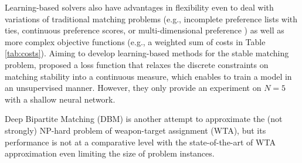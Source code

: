 Learning-based solvers also have advantages in flexibility even to deal with variations of traditional matching problems (e.g., incomplete preference lists with ties, continuous preference scores, or multi-dimensional preference \cite{multi_stable_matching}) as well as more complex objective functions (e.g., a weighted sum of costs in Table \ref{tab:costs}).
Aiming to develop learning-based methods for the stable matching problem, \cite{harvard2019} proposed a loss function that relaxes the discrete constraints on matching stability into a continuous measure, which enables to train a model in an unsupervised manner.
However, they only provide an experiment on $N=5$ with a shallow neural network.

Deep Bipartite Matching (DBM) \cite{gibbons2019deep} is another attempt to approximate the (not strongly) NP-hard problem of weapon-target assignment (WTA), but its performance is not at a comparative level with the state-of-the-art of WTA approximation
\cite{ahuja2007exact} even limiting the size of problem instances.
